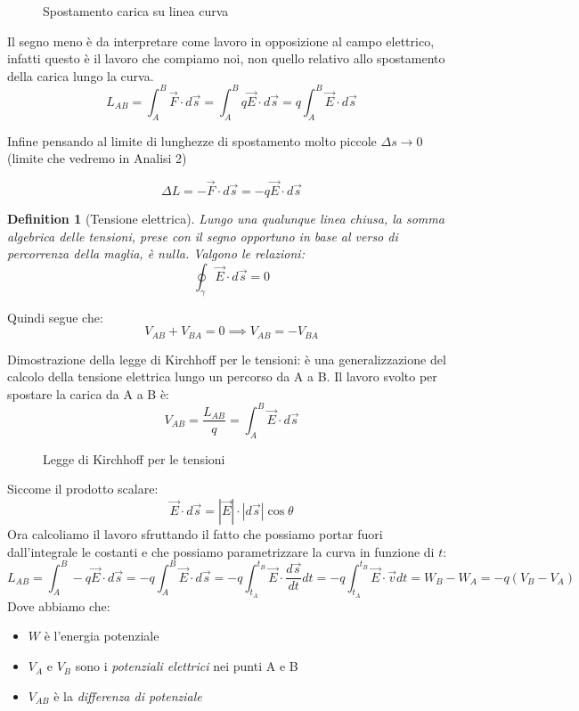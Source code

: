 \documentclass[12pt, a4paper]{article}
\newtheorem{definition}{Definition}[section]
\begin{document}
\begin{figure}[h]
    \centering
    \caption{Spostamento carica su linea curva}
\end{figure}

Il segno meno è da interpretare come lavoro in opposizione al campo elettrico, infatti questo è il lavoro che compiamo noi, non quello relativo allo spostamento della carica lungo la curva.
\[
L_{AB} = \int_A^B \vec{F} \cdot d\vec{s} = \int_A^B q \vec{E} \cdot d\vec{s} = q \int_A^B \vec{E} \cdot d\vec{s}
\]

Infine pensando al limite di lunghezze di spostamento molto piccole $\Delta s \to 0$ (limite che vedremo in Analisi 2)

\[
\Delta L = - \vec{F} \cdot d\vec{s} = - q \vec{E} \cdot d\vec{s}
\]

\begin{definition}[Tensione elettrica]
Lungo una qualunque linea chiusa, la somma algebrica delle tensioni, prese con il segno opportuno in base al verso di percorrenza della maglia, è nulla.
Valgono le relazioni:
\[
\oint_\gamma \vec{E} \cdot d\vec{s} = 0
\]
\end{definition}

Quindi segue che:
\[
V_{AB} + V_{BA} = 0 \implies V_{AB} = -V_{BA}
\]

Dimostrazione della legge di Kirchhoff per le tensioni: è una generalizzazione del calcolo della tensione elettrica lungo un percorso da A a B. Il lavoro svolto per spostare la carica da A a B è:
\[
V_{AB} = \frac{L_{AB}}{q} = \int_A^B \vec{E} \cdot d\vec{s}
\]

\newpage

\begin{figure}[h]
    \centering
    \caption{Legge di Kirchhoff per le tensioni}
\end{figure}

Siccome il prodotto scalare:
\[
\vec{E} \cdot d\vec{s} = |\vec{E}| \cdot |d\vec{s}| \cos \theta
\]
Ora calcoliamo il lavoro sfruttando il fatto che possiamo portar fuori dall'integrale le costanti e che possiamo parametrizzare la curva in funzione di $t$:
\[
L_{AB} = \int_A^B -q \vec{E} \cdot d\vec{s} = -q \int_A^B \vec{E} \cdot d\vec{s} = -q \int_{t_A}^{t_B} \vec{E} \cdot \frac{d\vec{s}}{dt} dt = -q \int_{t_A}^{t_B} \vec{E} \cdot \vec{v} dt = W_B - W_A = -q(V_B - V_A)
\]
Dove abbiamo che:
\begin{itemize}
    \item $W$ è l'energia potenziale
    \item $V_{A}$ e $V_{B}$ sono i \textit{potenziali elettrici} nei punti A e B
    \item $V_{AB}$ è la \textit{differenza di potenziale}
\end{itemize}
\end{document}
